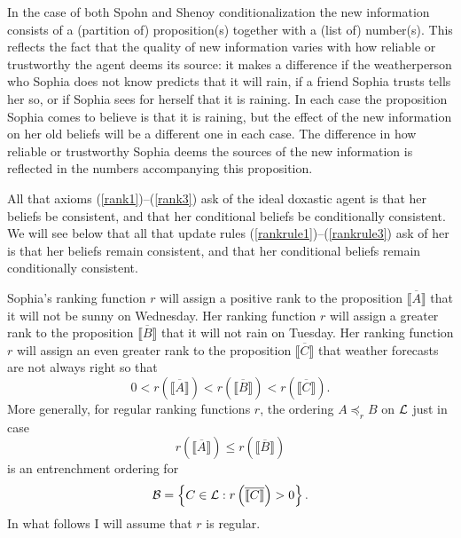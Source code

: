 In the case of both Spohn and Shenoy conditionalization the new information consists of a (partition of) proposition(s) together with a (list of) number(s). This reflects the fact that the quality of new information varies with how reliable or trustworthy the agent deems its source: it makes a difference if the weatherperson who Sophia does not know predicts that it will rain, if a friend Sophia trusts tells her so, or if Sophia sees for herself that it is raining. In each case the proposition Sophia comes to believe is that it is raining, but the effect of the new information on her old beliefs will be a different one in each case. The difference in how reliable or trustworthy Sophia deems the sources of the new information is reflected in the numbers accompanying this proposition.%

All that axioms (\ref{rank1})--(\ref{rank3}) ask of the ideal doxastic agent is that her beliefs be consistent, and that her conditional beliefs be conditionally consistent. We will see below that all that update rules (\ref{rankrule1})--(\ref{rankrule3}) ask of her is that her beliefs remain consistent, and that her conditional beliefs remain conditionally consistent.

Sophia's ranking function $r$ will assign a positive rank to the proposition $\overline{\llbracket A\rrbracket}$ that it will not be sunny on Wednesday. Her ranking function $r$ will assign a greater rank to the proposition $\overline{\llbracket B\rrbracket}$ that it will not rain on Tuesday. Her ranking function $r$ will assign an even greater rank to the proposition $\overline{\llbracket C\rrbracket}$ that weather forecasts are not always right so that
$$0<r\left(\overline{\llbracket A\rrbracket}\right)<r\left(\overline{\llbracket B\rrbracket}\right)<r\left(\overline{\llbracket C\rrbracket}\right).$$
More generally, for regular ranking functions $r$, the ordering $A\preceq_r B$ on $\cal L$ just in case 
$$r\left(\overline{\llbracket A\rrbracket}\right)\leq r\left(\overline{\llbracket B\rrbracket}\right)$$ %
is an entrenchment ordering for
$$\begin{cal}B\end{cal}=\left\{C\in\begin{cal}L\end{cal}:r\left(\overline{\llbracket C\rrbracket}\right)>0\right\}.$$
In what follows I will assume that $r$ is regular.


